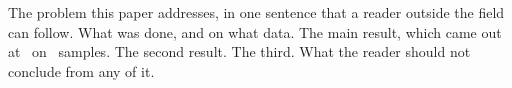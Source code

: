 %
The problem this paper addresses, in one sentence that a reader outside the field can follow. What was done, and
on what data. The main result, which came out at \DemoHeadline\ on \DemoNSamples\ samples. The second result. The
third. What the reader should not conclude from any of it.
